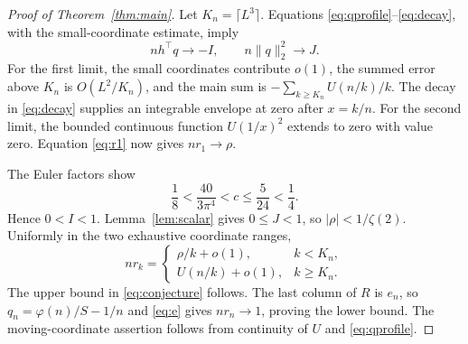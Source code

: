 \documentclass[11pt]{article}
\theoremstyle{remark}\newtheorem{remark}[theorem]{Remark}
\begin{document}
\begin{proof}[Proof of Theorem~\ref{thm:main}]
Let $K_n=\lceil L^3\rceil$. Equations \eqref{eq:qprofile}--\eqref{eq:decay}, with the small-coordinate estimate, imply
\[
 nh^\top q\longrightarrow-I,\qquad n\|q\|_2^2\longrightarrow J.
\]
For the first limit, the small coordinates contribute $o(1)$, the summed error above $K_n$ is $O(L^2/K_n)$, and the main sum is $-\sum_{k\ge K_n}U(n/k)/k$. The decay in \eqref{eq:decay} supplies an integrable envelope at zero after $x=k/n$. For the second limit, the bounded continuous function $U(1/x)^2$ extends to zero with value zero. Equation \eqref{eq:r1} now gives $nr_1\to\rho$.

The Euler factors show
\[
 \frac18<\frac{40}{3\pi^4}<c\le\frac5{24}<\frac14.
\]
Hence $0<I<1$. Lemma~\ref{lem:scalar} gives $0\le J<1$, so $|\rho|<1/\zeta(2)$. Uniformly in the two exhaustive coordinate ranges,
\[
 nr_k=\begin{cases}
 \rho/k+o(1),&k<K_n,\\
 U(n/k)+o(1),&k\ge K_n.
 \end{cases}
\]
The upper bound in \eqref{eq:conjecture} follows. The last column of $R$ is $e_n$, so $q_n=\varphi(n)/S-1/n$ and \eqref{eq:e} gives $nr_n\to1$, proving the lower bound. The moving-coordinate assertion follows from continuity of $U$ and \eqref{eq:qprofile}.
\end{proof}
\end{document}
